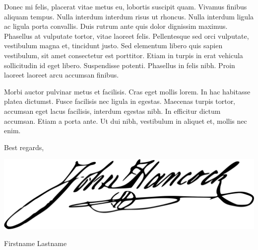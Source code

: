 \documentclass[
  11pt,
]{article}
\begin{document}
Donec mi felis, placerat vitae metus eu, lobortis suscipit quam. Vivamus
finibus aliquam tempus. Nulla interdum interdum risus ut rhoncus. Nulla
interdum ligula ac ligula porta convallis. Duis rutrum ante quis dolor
dignissim maximus. Phasellus at vulputate tortor, vitae laoreet felis.
Pellentesque sed orci vulputate, vestibulum magna et, tincidunt justo.
Sed elementum libero quis sapien vestibulum, sit amet consectetur est
porttitor. Etiam in turpis in erat vehicula sollicitudin id eget libero.
Suspendisse potenti. Phasellus in felis nibh. Proin laoreet laoreet arcu
accumsan finibus.

Morbi auctor pulvinar metus et facilisis. Cras eget mollis lorem. In hac
habitasse platea dictumst. Fusce facilisis nec ligula in egestas.
Maecenas turpis tortor, accumsan eget lacus facilisis, interdum egestas
nibh. In efficitur dictum accumsan. Etiam a porta ante. Ut dui nibh,
vestibulum in aliquet et, mollis nec enim.

Best regards,

\includegraphics[width=0.3\linewidth]{john-hancock}

Firstname Lastname
\end{document}
